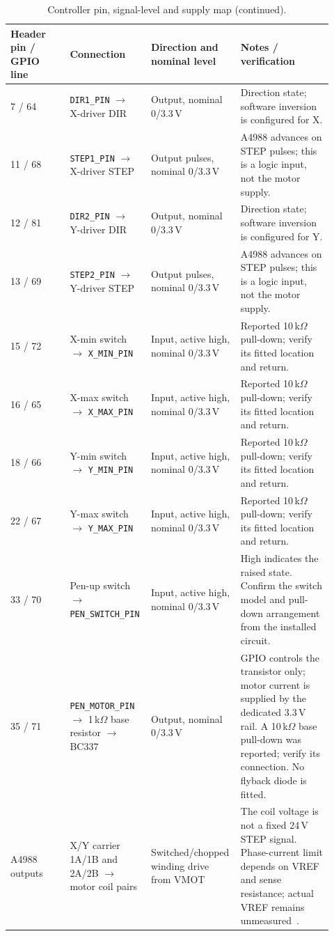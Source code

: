 \begin{table}[!htbp]\ContinuedFloat\centering\small
\setlength{\tabcolsep}{3pt}\renewcommand{\arraystretch}{1.03}
\begin{tabular}{p{0.18\linewidth}p{0.22\linewidth}p{0.23\linewidth}p{0.29\linewidth}}\toprule
\textbf{Header pin / GPIO line} & \textbf{Connection} & \textbf{Direction and nominal level} & \textbf{Notes / verification}\\\midrule
7 / 64 & \texttt{DIR1\_PIN} $\rightarrow$ X-driver DIR & Output, nominal 0/3.3\,V & Direction state; software inversion is configured for X.\\
11 / 68 & \texttt{STEP1\_PIN} $\rightarrow$ X-driver STEP & Output pulses, nominal 0/3.3\,V & A4988 advances on STEP pulses; this is a logic input, not the motor supply.\\
12 / 81 & \texttt{DIR2\_PIN} $\rightarrow$ Y-driver DIR & Output, nominal 0/3.3\,V & Direction state; software inversion is configured for Y.\\
13 / 69 & \texttt{STEP2\_PIN} $\rightarrow$ Y-driver STEP & Output pulses, nominal 0/3.3\,V & A4988 advances on STEP pulses; this is a logic input, not the motor supply.\\
15 / 72 & X-min switch $\rightarrow$ \texttt{X\_MIN\_PIN} & Input, active high, nominal 0/3.3\,V & Reported 10\,k$\Omega$ pull-down; verify its fitted location and return.\\
16 / 65 & X-max switch $\rightarrow$ \texttt{X\_MAX\_PIN} & Input, active high, nominal 0/3.3\,V & Reported 10\,k$\Omega$ pull-down; verify its fitted location and return.\\
18 / 66 & Y-min switch $\rightarrow$ \texttt{Y\_MIN\_PIN} & Input, active high, nominal 0/3.3\,V & Reported 10\,k$\Omega$ pull-down; verify its fitted location and return.\\
22 / 67 & Y-max switch $\rightarrow$ \texttt{Y\_MAX\_PIN} & Input, active high, nominal 0/3.3\,V & Reported 10\,k$\Omega$ pull-down; verify its fitted location and return.\\
33 / 70 & Pen-up switch $\rightarrow$ \texttt{PEN\_SWITCH\_PIN} & Input, active high, nominal 0/3.3\,V & High indicates the raised state. Confirm the switch model and pull-down arrangement from the installed circuit.\\
35 / 71 & \texttt{PEN\_MOTOR\_PIN} $\rightarrow$ 1\,k$\Omega$ base resistor $\rightarrow$ BC337 & Output, nominal 0/3.3\,V & GPIO controls the transistor only; motor current is supplied by the dedicated 3.3\,V rail. A 10\,k$\Omega$ base pull-down was reported; verify its connection. No flyback diode is fitted.\\
A4988 outputs & X/Y carrier 1A/1B and 2A/2B $\rightarrow$ motor coil pairs & Switched/chopped winding drive from VMOT & The coil voltage is not a fixed 24\,V STEP signal. Phase-current limit depends on VREF and sense resistance; actual VREF remains unmeasured~\cite[PDF pp.~4--5, 9]{a4988ds}.\\
\bottomrule\end{tabular}
\caption{Controller pin, signal-level and supply map (continued).}
\end{table}
\FloatBarrier



